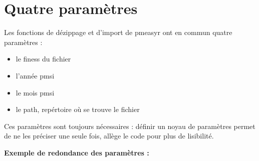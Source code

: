 \documentclass[
]{book}
\providecommand{\tightlist}{%
  \setlength{\itemsep}{0pt}\setlength{\parskip}{0pt}}
\begin{document}
\hypertarget{quatre-paramuxe8tres}{%
\section{Quatre paramètres}\label{quatre-paramuxe8tres}}

Les fonctions de dézippage et d'import de pmeasyr ont en commun quatre paramètres :

\begin{itemize}
\tightlist
\item
  le finess du fichier
\item
  l'année pmsi
\item
  le mois pmsi
\item
  le path, repértoire où se trouve le fichier
\end{itemize}

Ces paramètres sont toujours nécessaires : définir un noyau de paramètres permet de ne les préciser une seule fois, allège le code pour plus de lisibilité.

\textbf{Exemple de redondance des paramètres :}
\end{document}
